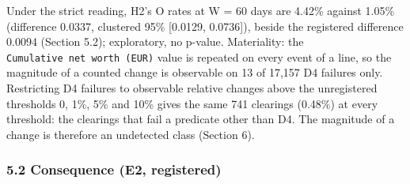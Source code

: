 \documentclass[
  10pt,
]{article}
\begin{document}
Under the strict reading, H2's O rates at W = 60 days are 4.42\% against
1.05\% (difference 0.0337, clustered 95\% {[}0.0129, 0.0736{]}), beside
the registered difference 0.0094 (Section 5.2); exploratory, no p-value.
Materiality: the \texttt{Cumulative\ net\ worth\ (EUR)} value is
repeated on every event of a line, so the magnitude of a counted change
is observable on 13 of 17,157 D4 failures only. Restricting D4 failures
to observable relative changes above the unregistered thresholds 0, 1\%,
5\% and 10\% gives the same 741 clearings (0.48\%) at every threshold:
the clearings that fail a predicate other than D4. The magnitude of a
change is therefore an undetected class (Section 6).

\hypertarget{consequence-e2-registered}{%
\subsubsection{5.2 Consequence (E2,
registered)}\label{consequence-e2-registered}}
\end{document}
